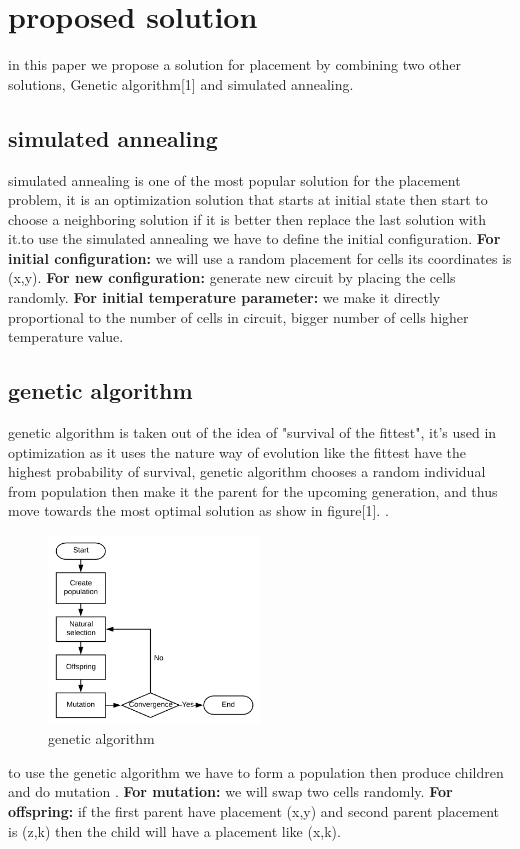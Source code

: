 \documentclass[conference]{IEEEtran}
\begin{document}
\section{proposed solution}
in this paper we propose a solution for placement by combining two
other solutions, Genetic algorithm[1] and simulated annealing.
\subsection{simulated annealing}
simulated annealing is one of the most popular solution for the placement problem, it is an optimization solution that starts at initial state then start to choose a neighboring solution if it is better then replace the last solution with it.to use the simulated annealing we have to define the initial configuration.
\newline
\textbf{For initial configuration:} we will use a random placement for cells its coordinates is (x,y).
\newline
\textbf{For new configuration:} generate new circuit by placing the cells randomly.
\newline
\textbf{For initial temperature parameter:} we make it directly proportional to the number of cells in circuit, bigger number of cells higher temperature value.
\subsection{genetic algorithm}
genetic algorithm is taken out of the idea of "survival of the fittest", it's used in optimization as it uses the nature way of evolution like the fittest have the highest probability of survival, genetic algorithm chooses a random individual from population then make it the parent for the upcoming generation, and thus move towards the most optimal solution as show in figure[1].
.
 \begin{figure}[h]
    \includegraphics[width=0.5\textwidth]{images/gene.png}
    \caption{genetic algorithm}
\end{figure}
\newline
to use the genetic algorithm we have to form a population then produce children and do mutation .
\newline
\textbf{For mutation:} we will swap two cells randomly.
\newline
\textbf{For offspring:} if the first parent have placement (x,y) and second parent placement is (z,k) then the child will have a placement like (x,k).
\end{document}
